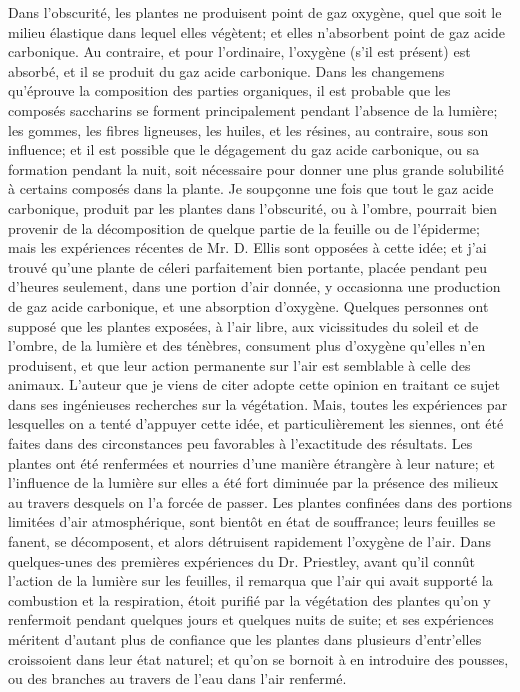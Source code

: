 Dans l'obscurité, les plantes ne produisent point de gaz oxygène, quel que soit le milieu élastique dans lequel elles végètent; et elles n'absorbent point de gaz acide carbonique. Au contraire, et pour l'ordinaire, l'oxygène (s'il est présent) est absorbé, et il se produit du gaz acide carbonique.
Dans les changemens qu'éprouve la composition des parties organiques, il est probable que les composés saccharins se forment principalement pendant l'absence de la lumière; les gommes, les fibres ligneuses, les huiles, et les résines, au contraire, sous son influence; et il est possible que le dégagement du gaz acide carbonique, ou sa formation pendant la nuit, soit nécessaire pour donner une plus grande solubilité à certains composés dans la plante. Je soupçonne une fois que tout le gaz acide carbonique, produit par les plantes dans l'obscurité, ou à l'ombre, pourrait bien provenir de la décomposition de quelque partie de la feuille ou de l'épiderme; mais les expériences récentes de Mr. D. Ellis sont opposées à cette idée; et j'ai trouvé qu'une plante de céleri parfaitement bien portante, placée pendant peu d'heures seulement, dans une portion d'air donnée,\setcounter{page}{26} y occasionna une production de gaz acide carbonique, et une absorption d'oxygène. Quelques personnes ont supposé que les plantes exposées, à l'air libre, aux vicissitudes du soleil et de l'ombre, de la lumière et des ténèbres, consument plus d'oxygène qu'elles n'en produisent, et que leur action permanente sur l'air est semblable à celle des animaux. L'auteur que je viens de citer adopte cette opinion en traitant ce sujet dans ses ingénieuses recherches sur la végétation. Mais, toutes les expériences par lesquelles on a tenté d'appuyer cette idée, et particulièrement les siennes, ont été faites dans des circonstances peu favorables à l'exactitude des résultats. Les plantes ont été renfermées et nourries d'une manière étrangère à leur nature; et l'influence de la lumière sur elles a été fort diminuée par la présence des milieux au travers desquels on l'a forcée de passer. Les plantes confinées dans des portions limitées d'air atmosphérique, sont bientôt en état de souffrance; leurs feuilles se fanent, se décomposent, et alors détruisent rapidement l'oxygène de l'air. Dans quelques-unes des premières expériences du Dr. Priestley, avant qu'il connût l'action de la lumière sur les feuilles, il remarqua que l'air qui avait supporté la combustion et la respiration, étoit purifié par la végétation des\setcounter{page}{27} plantes qu'on y renfermoit pendant quelques jours et quelques nuits de suite; et ses expériences méritent d'autant plus de confiance que les plantes dans plusieurs d'entr'elles croissoient dans leur état naturel; et qu'on se bornoit à en introduire des pousses, ou des branches au travers de l'eau dans l'air renfermé.
